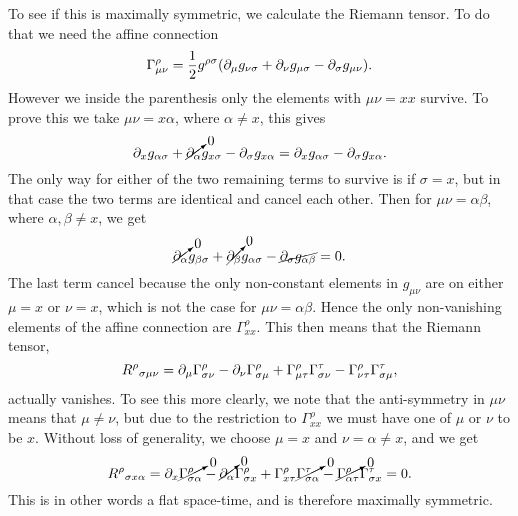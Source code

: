 \documentclass[11pt,a4paper, 
swedish, english %
]{article}
\begin{document}
To see if this is maximally symmetric, we calculate the Riemann
tensor. To do that we need the affine connection
\begin{equation}
\Gamma^\rho_{\mu\nu}=\frac{1}{2}g^{\rho\sigma}
\qty(\partial_{\mu}g_{\nu\sigma}+\partial_{\nu}g_{\mu\sigma}-\partial_{\sigma}g_{\mu\nu}).
\end{equation}
However we inside the parenthesis only the elements with $\mu\nu=xx$
survive. To prove this we take $\mu\nu=x\alpha$, where $\alpha\neq x$,
this gives
\begin{equation}
\partial_{x}g_{\alpha\sigma}+\cancelto{0}{\partial_{\alpha}}g_{x\sigma}-\partial_{\sigma}g_{x\alpha}
=\partial_{x}g_{\alpha\sigma}-\partial_{\sigma}g_{x\alpha}.
\end{equation}
The only way for either of the two remaining terms to survive is if
$\sigma=x$, but in that case the two terms are identical and cancel
each other. Then for $\mu\nu=\alpha\beta$, where $\alpha,\beta\neq x$,
we get
\vspace{-1em}
\begin{equation}
\cancelto{0}{\partial_{\alpha}}g_{\beta\sigma}
+\cancelto{0}{\partial_{\beta}}g_{\alpha\sigma}
-\cancel{\partial_{\sigma}g_{\alpha\beta}}=0.
\end{equation}
The last term cancel because the only non-constant elements in
$g_{\mu\nu}$ are on either $\mu=x$ or $\nu=x$, which is not the case
for $\mu\nu=\alpha\beta$. Hence the only non-vanishing elements of the
affine connection are $\Gamma^\rho_{xx}$. This then means that the
Riemann tensor,
\begin{equation}
{R^\rho}_{\sigma\mu\nu}=
\partial_{\mu}\Gamma^\rho_{\sigma\nu}-\partial_{\nu}\Gamma^\rho_{\sigma\mu}
+\Gamma^\rho_{\mu\tau}\Gamma^\tau_{\sigma\nu}
-\Gamma^\rho_{\nu\tau}\Gamma^\tau_{\sigma\mu},
\end{equation}
actually vanishes. To see this more clearly, we note that the
anti-symmetry in $\mu\nu$ means that $\mu\neq\nu$, but due to the
restriction to $\Gamma^\rho_{xx}$ we must have one of $\mu$ or $\nu$
to be $x$. Without loss of generality, we choose $\mu=x$ and
$\nu=\alpha\neq x$, and we get
\begin{equation}
{R^\rho}_{\sigma x\alpha}=
\partial_{x}\cancelto{0}{\Gamma^\rho_{\sigma\alpha}}
-\cancelto{0}{\partial_{\alpha}}\Gamma^\rho_{\sigma x}
+\Gamma^\rho_{x\tau}\cancelto{0}{\Gamma^\tau_{\sigma\alpha}}
-\cancelto{0}{\Gamma^\rho_{\alpha\tau}}\Gamma^\tau_{\sigma x}=0.
\end{equation}
This is in other words a flat space-time, and is therefore maximally
symmetric.
\end{document}
